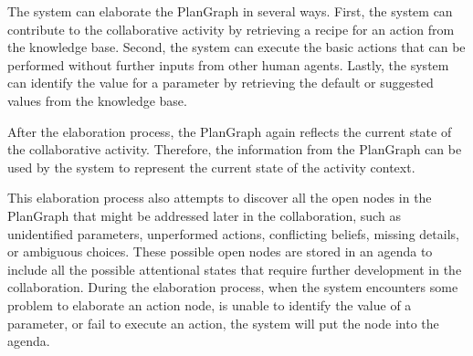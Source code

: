 The system can elaborate the PlanGraph in several ways. First, the system can contribute to the collaborative activity by retrieving a recipe for an action from the knowledge base. Second, the system can execute the basic actions that can be performed without further inputs from other human agents. Lastly, the system can identify the value for a parameter by retrieving the default or suggested values from the knowledge base. 

After the elaboration process, the PlanGraph again reflects the current state of the collaborative activity. Therefore, the information from the PlanGraph can be used by the system to represent the current state of the activity context. 

This elaboration process also attempts to discover all the open nodes in the PlanGraph that might be addressed later in the collaboration, such as unidentified parameters, unperformed actions, conflicting beliefs, missing details, or ambiguous choices. These possible open nodes are   stored in an agenda to include all the possible attentional states that require further development in the collaboration. During the elaboration process, when the system encounters some problem to elaborate an action node, is unable to identify the value of a parameter, or fail to execute an action, the system will put the node into the agenda.






 

